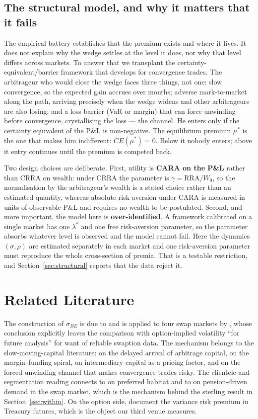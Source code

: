 \documentclass[11pt]{article}
\newcommand{\sBE}{\sigma_{BE}}
\begin{document}
\subsection{The structural model, and why it matters that it fails}\label{sec:structural-theory}
The empirical battery establishes that the premium exists and where it lives. It does not explain why
the wedge settles at the level it does, nor why that level differs across markets. To answer that we
transplant the certainty-equivalent/barrier framework that \citet{rebonatoNote} develops for
convergence trades. The arbitrageur who would close the wedge faces three things, not one: slow
convergence, so the expected gain accrues over months; adverse mark-to-market along the path, arriving
precisely when the wedge widens and other arbitrageurs are also losing; and a loss barrier (VaR or
margin) that can force unwinding before convergence, crystallising the loss --- the
\citet{sv1997} channel. He enters only if the certainty equivalent of the P\&L is non-negative. The
equilibrium premium $\mu^\ast$ is the one that makes him indifferent: $CE(\mu^\ast)=0$. Below it nobody
enters; above it entry continues until the premium is competed back.

Two design choices are deliberate. First, utility is \textbf{CARA on the P\&L} rather than CRRA on
wealth: under CRRA the parameter is $\gamma=\mathrm{RRA}/W_0$, so the normalisation by the
arbitrageur's wealth is a stated choice rather than an estimated quantity, whereas absolute risk
aversion under CARA is measured in units of observable P\&L and requires no wealth to be postulated.
Second, and more important, the model here is \textbf{over-identified}. A framework calibrated on a
single market has one $\lambda^\ast$ and one free risk-aversion parameter, so the parameter absorbs
whatever level is observed and the model cannot fail. Here the dynamics
$(\sigma,\rho)$ are estimated separately in each market and one risk-aversion parameter must reproduce
the whole cross-section of premia. That is a testable restriction, and Section~\ref{sec:structural}
reports that the data reject it.

\section{Related Literature}\label{sec:lit}
The construction of $\sBE$ is due to \citet{rp2018} and is applied to four swap markets by
\citet{rr2021}, whose conclusion explicitly leaves the comparison with option-implied volatility ``for
future analysis'' for want of reliable swaption data. The mechanism belongs to the slow-moving-capital
literature: \citet{duffie2010} on the delayed arrival of arbitrage capital, \citet{bp2009} on the
margin--funding spiral, \citet{hkm2017} on intermediary capital as a pricing factor, and
\citet{sv1997} on the forced-unwinding channel that makes convergence trades risky. The
clientele-and-segmentation reading connects to \citet{vv2021} on preferred habitat and to
\citet{ks2023} on pension-driven demand in the swap market, which is the mechanism behind the sterling
result in Section~\ref{sec:within}. On the option side, \citet{cfj2021} document the variance risk
premium in Treasury futures, which is the object our third venue measures.
\end{document}
